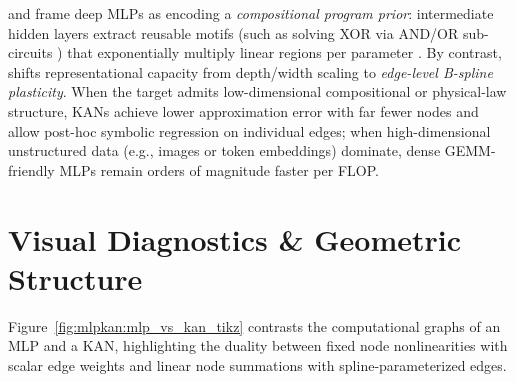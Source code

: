 \documentclass[../../../../master.tex]{subfiles}
\begin{document}
\begin{crossbook}
\label{box:mlpkan:synthesis}
 and  frame deep MLPs as encoding a \emph{compositional program prior}: intermediate hidden layers extract reusable motifs (such as solving XOR via AND/OR sub-circuits ) that exponentially multiply linear regions per parameter . By contrast,  shifts representational capacity from depth/width scaling to \emph{edge-level B-spline plasticity}. When the target admits low-dimensional compositional or physical-law structure, KANs achieve lower approximation error with far fewer nodes and allow post-hoc symbolic regression on individual edges; when high-dimensional unstructured data (e.g., images or token embeddings) dominate, dense GEMM-friendly MLPs remain orders of magnitude faster per FLOP.
\end{crossbook}

\section{Visual Diagnostics \& Geometric Structure}
\label{sec:mlpkan:visuals}

Figure~\ref{fig:mlpkan:mlp_vs_kan_tikz} contrasts the computational graphs of an MLP and a KAN, highlighting the duality between fixed node nonlinearities with scalar edge weights and linear node summations with spline-parameterized edges.
\end{document}
